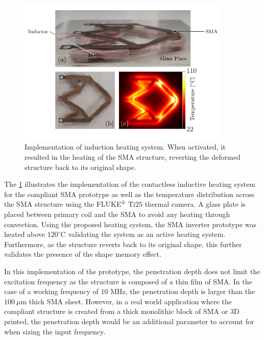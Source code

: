 \begin{figure}[t]
    \centering
    \includegraphics[width=0.9\textwidth]{images/chap5/induction-heating-temp-annotated.pdf}
    \caption[Implementation of induction heating system]{Implementation of induction heating system. When activated, it resulted in the heating of the SMA structure, reverting the deformed structure back to its original shape.}
    \label{fig:induction-heating-temp}
\end{figure}

The \cref{fig:induction-heating-temp} illustrates the implementation of the contactless inductive heating system for the compliant SMA prototype as well as the temperature distribution across the SMA structure using the FLUKE$\textsuperscript \textregistered$ Ti$25$ thermal camera. A glass plate is placed between primary coil and the SMA to avoid any heating through convection. Using the proposed heating system, the SMA inverter prototype was heated above $120^{\circ}$C validating the system as an active heating system. Furthermore, as the structure reverts back to its original shape, this further validates the presence of the shape memory effect.

In this implementation of the prototype, the penetration depth does not limit the excitation frequency as the structure is composed of a thin film of SMA. In the case of a working frequency of $10$ MHz, the penetration depth is larger than the $100~\mu$m thick SMA sheet. However, in a real world application where the compliant structure is created from a thick monolithic block of SMA or 3D printed, the penetration depth would be an additional parameter to account for when sizing the input frequency.

